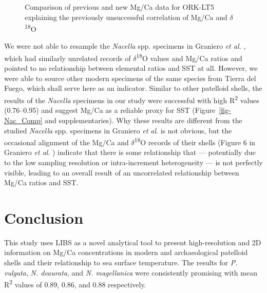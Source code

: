 \documentclass[
  authoryear,
  preprint,
  3p]{elsarticle}
\begin{document}
\begin{figure}


\caption{\label{fig-ORK_sub}Comparison of previous and new Mg/Ca data
for ORK-LT5 explaining the previously unsuccessful correlation of Mg/Ca
and $\delta$\textsuperscript{18}O}

\end{figure}%

We were not able to resample the \emph{Nacella} spp. specimens in
Graniero \emph{et al.} \citeyearpar{Graniero2017-io}, which had
similarly unrelated records of $\delta$\textsuperscript{18}O values
and Mg/Ca ratios and pointed to no relationship between elemental ratios
and SST at all. However, we were able to source other modern specimens
of the same species from Tierra del Fuego, which shall serve here as an
indicator. Similar to other patelloid shells, the results of the
\emph{Nacella} specimens in our study were successful with high
R\textsuperscript{2} values (0.76--0.95) and suggest Mg/Ca as a reliable
proxy for SST (Figure~\ref{fig-Nac_Comp} and supplementaries). Why these
results are different from the studied \emph{Nacella} spp. specimens in
Graniero \emph{et al}. \citeyearpar{Graniero2017-io} is not obvious, but
the occasional alignment of the Mg/Ca and
$\delta$\textsuperscript{18}O records of their shells (Figure 6 in
Graniero \emph{et al}. \citeyearpar{Graniero2017-io}) indicate that
there is some relationship that --- potentially due to the low sampling
resolution or intra-increment heterogeneity --- is not perfectly
visible, leading to an overall result of an uncorrelated relationship
between Mg/Ca ratios and SST.

\section{Conclusion}\label{conclusion}

This study uses LIBS as a novel analytical tool to present
high-resolution and 2D information on Mg/Ca concentrations in modern and
archaeological patelloid shells and their relationship to sea surface
temperature. The results for \emph{P. vulgata}, \emph{N. deaurata}, and
\emph{N. magellanica} were consistently promising with mean
R\textsuperscript{2} values of 0.89, 0.86, and 0.88 respectively.
\end{document}

